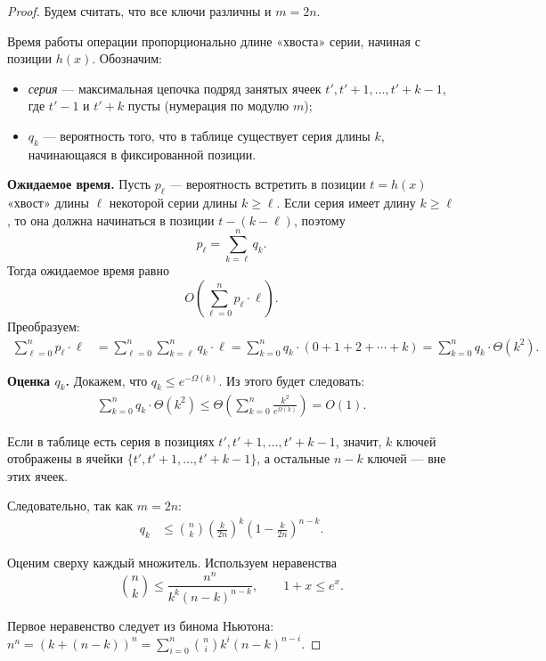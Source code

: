 \begin{proof}
	Будем считать, что все ключи различны и $m = 2n$.
	
	Время работы операции пропорционально длине «хвоста» серии, начиная с позиции $h(x)$. Обозначим:
	\begin{itemize}
		\item \emph{серия} — максимальная цепочка подряд занятых ячеек $t', t'+1, \ldots, t'+k-1$, где $t'-1$ и $t'+k$ пусты (нумерация по модулю $m$);
		\item $q_k$ — вероятность того, что в таблице существует серия длины $k$, начинающаяся в фиксированной позиции.
	\end{itemize}
	
	\noindent\textbf{Ожидаемое время.}
	Пусть $p_\ell$ — вероятность встретить в позиции $t = h(x)$ «хвост» длины $\ell$ некоторой серии длины $k \geq \ell$.
	Если серия имеет длину $k \geq \ell$, то она должна начинаться в позиции $t - (k - \ell)$, поэтому
	\[
	p_\ell = \sum_{k=\ell}^{n} q_k.
	\]
	Тогда ожидаемое время равно
	\[
	O\!\left(\sum_{\ell=0}^{n} p_\ell \cdot \ell\right).
	\]
	Преобразуем:
	\begin{align*}
		\sum_{\ell=0}^{n} p_\ell \cdot \ell
		&= \sum_{\ell=0}^{n} \sum_{k=\ell}^{n} q_k \cdot \ell
		= \sum_{k=0}^{n} q_k \cdot (0 + 1 + 2 + \cdots + k)
		= \sum_{k=0}^{n} q_k \cdot \Theta(k^2).
	\end{align*}
	
	\noindent\textbf{Оценка $q_k$.}
	Докажем, что $q_k \leq e^{-\Omega(k)}$. Из этого будет следовать:
	\begin{align*}
		\sum_{k=0}^{n} q_k \cdot \Theta(k^2)
		\leq \Theta\!\left(\sum_{k=0}^{n} \frac{k^2}{e^{\Omega(k)}}\right) = O(1).
	\end{align*}
	
	Если в таблице есть серия в позициях $t', t'+1, \ldots, t'+k-1$, значит, $k$ ключей отображены в ячейки
	$\{t', t'+1, \ldots, t'+k-1\}$, а остальные $n - k$ ключей — вне этих ячеек.
	
	Следовательно, так как $m = 2n$:
	\begin{align*}
		q_k
		&\leq \binom{n}{k}
		\left(\frac{k}{2n}\right)^k
		\left(1 - \frac{k}{2n}\right)^{n-k}.
	\end{align*}
	
	Оценим сверху каждый множитель. Используем неравенства
	\[
	\binom{n}{k} \leq \frac{n^n}{k^k (n-k)^{n-k}},
	\qquad
	1+x \leq e^x.
	\]
	
	Первое неравенство следует из бинома Ньютона: $n^n = (k + (n-k))^n
	= \sum_{i=0}^{n} \binom{n}{i} k^i (n-k)^{n-i}.$
	

\end{proof}
